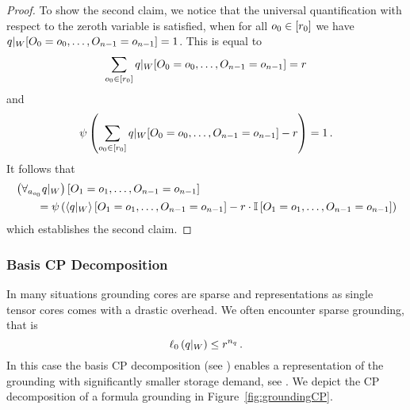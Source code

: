 \begin{proof}
	To show the second claim, we notice that the universal quantification with respect to the zeroth variable is satisfied, when for all $o_{0}\in[r_{0}]$ we have ${q}|_{W}[O_{0}=o_{0},\ldots,O_{n-1}=o_{n-1}]=1$.
	This is equal to 
	\begin{align*}
		 \sum_{o_{0}\in[r_{0}]} {q}|_{W}[O_{0}=o_{0},\ldots,O_{n-1}=o_{n-1}]  = r
	\end{align*}
	and 
	\begin{align*}
		\psi\left(\sum_{o_{0}\in[r_{0}]} {q}|_{W}[O_{0}=o_{0},\ldots,O_{n-1}=o_{n-1}] - r\right) = 1 \, . 
	\end{align*} 
	It follows that
	\begin{align*}
		& \left({\forall_{a_{o_{0}}} q}|_{W}\right)[O_{1}=o_{1},\ldots,O_{n-1}=o_{n-1}] \\
			& \quad \quad =  \psi\left(
			\left\langle {q}|_{W}\right\rangle \left[ O_{1}=o_{1},\ldots,O_{n-1}=o_{n-1} \right]
			- r \cdot \mathbb{I}\left[O_{1}=o_{1},\ldots,O_{n-1}=o_{n-1}\right]
			\right)
	\end{align*}
	which establishes the second claim.
\end{proof}




\subsubsection{Basis CP Decomposition}\label{sec:basisCPgrounding}

In many situations grounding cores are sparse and representations as single tensor cores comes with a drastic overhead.
We often encounter sparse grounding, that is
	\[ \ell_0\left({q}|_{W}\right) \leq r^{n_q} \, . \]
In this case the basis CP decomposition (see ) enables a representation of the grounding with significantly smaller storage demand, see .
We depict the CP decomposition of a formula grounding in Figure~\ref{fig:groundingCP}.


